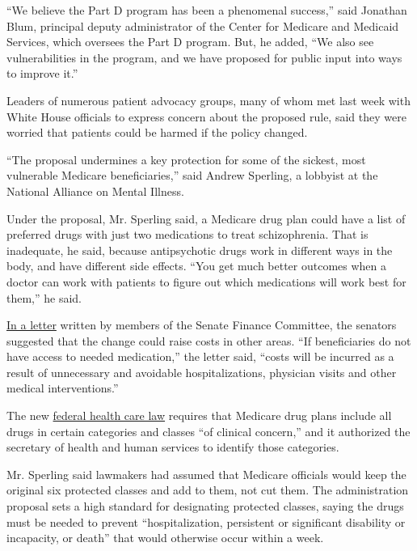 ``We believe the Part D program has been a phenomenal success,'' said
Jonathan Blum, principal deputy administrator of the Center for Medicare
and Medicaid Services, which oversees the Part D program. But, he added,
``We also see vulnerabilities in the program, and we have proposed for
public input into ways to improve it.''

Leaders of numerous patient advocacy groups, many of whom met last week
with White House officials to express concern about the proposed rule,
said they were worried that patients could be harmed if the policy
changed.

``The proposal undermines a key protection for some of the sickest, most
vulnerable Medicare beneficiaries,'' said Andrew Sperling, a lobbyist at
the National Alliance on Mental Illness.

Under the proposal, Mr. Sperling said, a Medicare drug plan could have a
list of preferred drugs with just two medications to treat
schizophrenia. That is inadequate, he said, because antipsychotic drugs
work in different ways in the body, and have different side effects.
``You get much better outcomes when a doctor can work with patients to
figure out which medications will work best for them,'' he said.

\href{http://naminc.org/wp-content/uploads/2014/01/SFC-Letter-to-CMS_Protected-Classes.pdf}{In
a letter} written by members of the Senate Finance Committee, the
senators suggested that the change could raise costs in other areas.
``If beneficiaries do not have access to needed medication,'' the letter
said, ``costs will be incurred as a result of unnecessary and avoidable
hospitalizations, physician visits and other medical interventions.''

The new
\href{http://topics.nytimes.com/top/news/health/diseasesconditionsandhealthtopics/health_insurance_and_managed_care/health_care_reform/index.html?inline=nyt-classifier}{federal
health care law} requires that Medicare drug plans include all drugs in
certain categories and classes ``of clinical concern,'' and it
authorized the secretary of health and human services to identify those
categories.

Mr. Sperling said lawmakers had assumed that Medicare officials would
keep the original six protected classes and add to them, not cut them.
The administration proposal sets a high standard for designating
protected classes, saying the drugs must be needed to prevent
``hospitalization, persistent or significant disability or incapacity,
or death'' that would otherwise occur within a week.

